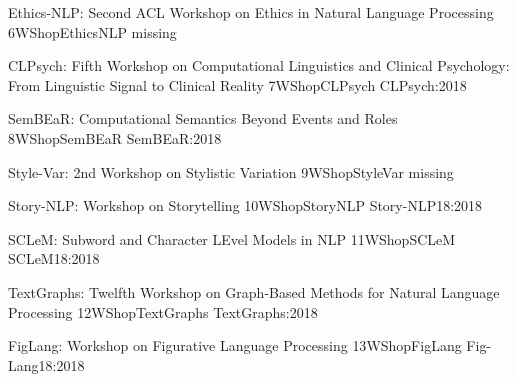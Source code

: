  \begin{wsschedule}
   {Ethics-NLP: Second ACL Workshop on Ethics in Natural Language Processing}
   {6}{WShopEthicsNLP}
   {missing}
   {\WShopLocG}
   
 \end{wsschedule}


\begin{wsschedule}
  {CLPsych: Fifth Workshop on Computational Linguistics and Clinical Psychology: From Linguistic Signal to Clinical Reality}
  {7}{WShopCLPsych}
  {CLPsych:2018}
  {\WShopLocZ}
  
\end{wsschedule}

\begin{wsschedule}
  {SemBEaR: Computational Semantics Beyond Events and Roles}
  {8}{WShopSemBEaR}
  {SemBEaR:2018}
  {\WShopLocG}
  
\end{wsschedule}

\begin{wsschedule}
  {Style-Var: 2nd Workshop on Stylistic Variation}
  {9}{WShopStyleVar}
  {missing}
  {\WShopLocH}
  
\end{wsschedule}

\begin{wsschedule}
  {Story-NLP: Workshop on Storytelling}
  {10}{WShopStoryNLP}
  {Story-NLP18:2018}
  {\WShopLocI}
  
\end{wsschedule}



\begin{wsschedule}
  {SCLeM: Subword and Character LEvel Models in NLP}
  {11}{WShopSCLeM}
  {SCLeM18:2018}
  {\WShopLocK}
  
\end{wsschedule}

  \begin{wsschedule}
   {TextGraphs: Twelfth Workshop on Graph-Based Methods for Natural Language Processing}
   {12}{WShopTextGraphs}
   {TextGraphs:2018}
   {\WShopLocP}
   
 \end{wsschedule}
 
  \begin{wsschedule}
   {FigLang: Workshop on Figurative Language Processing}
   {13}{WShopFigLang}
   {Fig-Lang18:2018}
   {\WShopLocP}
   
 \end{wsschedule}

